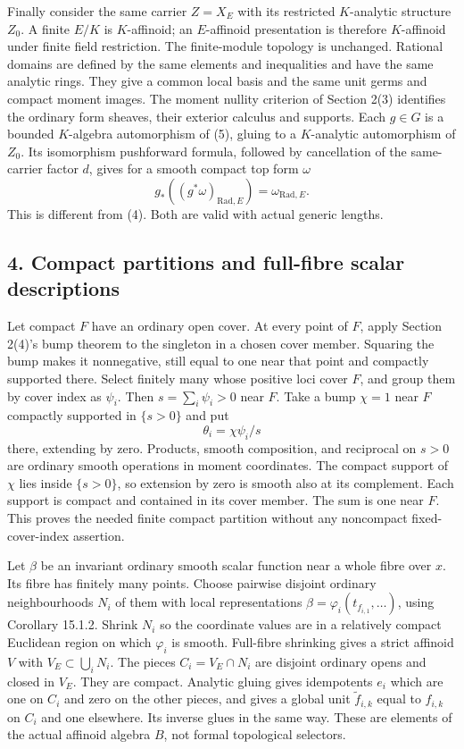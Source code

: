 \documentclass[
  11pt,
]{article}
\begin{document}
Finally consider the same carrier \(Z=X_E\) with its restricted
\(K\)-analytic structure \(Z_0\). A finite \(E/K\) is \(K\)-affinoid; an
\(E\)-affinoid presentation is therefore \(K\)-affinoid under finite
field restriction. The finite-module topology is unchanged. Rational
domains are defined by the same elements and inequalities and have the
same analytic rings. They give a common local basis and the same unit
germs and compact moment images. The moment nullity criterion of Section
2(3) identifies the ordinary form sheaves, their exterior calculus and
supports. Each \(g\in G\) is a bounded \(K\)-algebra automorphism of
(5), gluing to a \(K\)-analytic automorphism of \(Z_0\). Its isomorphism
pushforward formula, followed by cancellation of the same-carrier factor
\(d\), gives for a smooth compact top form \(\omega\) \[
             g_*((g^*\omega)_{\mathrm{Rad},E})
                            =\omega_{\mathrm{Rad},E}.    \tag{6}
\] This is different from (4). Both are valid with actual generic
lengths.

\subsection{4. Compact partitions and full-fibre scalar
descriptions}\label{compact-partitions-and-full-fibre-scalar-descriptions}

Let compact \(F\) have an ordinary open cover. At every point of \(F\),
apply Section 2(4)'s bump theorem to the singleton in a chosen cover
member. Squaring the bump makes it nonnegative, still equal to one near
that point and compactly supported there. Select finitely many whose
positive loci cover \(F\), and group them by cover index as \(\psi_i\).
Then \(s=\sum_i\psi_i>0\) near \(F\). Take a bump \(\chi=1\) near \(F\)
compactly supported in \(\{s>0\}\) and put \[
                \theta_i=\chi\psi_i/s                  \tag{7}
\] there, extending by zero. Products, smooth composition, and
reciprocal on \(s>0\) are ordinary smooth operations in moment
coordinates. The compact support of \(\chi\) lies inside \(\{s>0\}\), so
extension by zero is smooth also at its complement. Each support is
compact and contained in its cover member. The sum is one near \(F\).
This proves the needed finite compact partition without any noncompact
fixed-cover-index assertion.

Let \(\beta\) be an invariant ordinary smooth scalar function near a
whole fibre over \(x\). Its fibre has finitely many points. Choose
pairwise disjoint ordinary neighbourhoods \(N_i\) of them with local
representations \(\beta=\varphi_i(t_{f_{i,1}},\ldots)\), using Corollary
15.1.2. Shrink \(N_i\) so the coordinate values are in a relatively
compact Euclidean region on which \(\varphi_i\) is smooth. Full-fibre
shrinking gives a strict affinoid \(V\) with \(V_E\subset\bigcup_iN_i\).
The pieces \(C_i=V_E\cap N_i\) are disjoint ordinary opens and closed in
\(V_E\). They are compact. Analytic gluing gives idempotents \(e_i\)
which are one on \(C_i\) and zero on the other pieces, and gives a
global unit \(\widetilde f_{i,k}\) equal to \(f_{i,k}\) on \(C_i\) and
one elsewhere. Its inverse glues in the same way. These are elements of
the actual affinoid algebra \(B\), not formal topological selectors.
\end{document}
